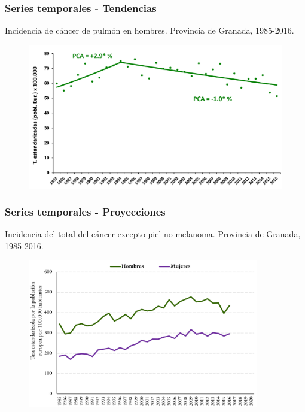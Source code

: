 \documentclass{beamer}
\begin{document}
\begin{frame}\frametitle{Series temporales - Tendencias}
	
	\centering
	Incidencia de cáncer de pulmón en hombres. Provincia de Granada, 1985-2016.
	\begin{figure}
		\centering
		\includegraphics[width=\textwidth]{images/tendencias_pulmon1.png}
	\end{figure}
	
\end{frame}


\begin{frame}\frametitle{Series temporales - Proyecciones}
	
	\footnotesize{Incidencia del total del cáncer excepto piel no melanoma. Provincia de Granada, 1985-2016.}
	\begin{figure}
		\centering
		\includegraphics[width=0.9\textwidth]{images/proyecciones0.png}
	\end{figure}
		
\end{frame}
\end{document}
